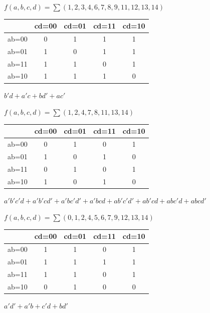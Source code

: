 \documentclass[a4paper,12pt]{article}
\begin{document}
\begin{question}
\begin{subquestion}
\(f(a,b,c,d)=\sum{(1,2,3,4,6,7,8,9,11,12,13,14)}\)\\[0pt]
\begin{answer}
\begin{tabular}{ c|c|c|c|c }
  & cd=00 & cd=01 & cd=11 & cd=10\\
  \hline
  ab=00 & 0 & 1 & 1 & 1\\
  ab=01 & 1 & 0 & 1 & 1\\
  ab=11 & 1 & 1 & 0 & 1\\
  ab=10 & 1 & 1 & 1 & 0
\end{tabular}
\(b'd+a'c+bd'+ac'\)\\[0pt]
\end{answer}
\end{subquestion}

\begin{subquestion}
\(f(a,b,c,d)=\sum{(1,2,4,7,8,11,13,14)}\)\\[0pt]
\begin{answer}
\begin{tabular}{ c|c|c|c|c }
  & cd=00 & cd=01 & cd=11 & cd=10\\
  \hline
  ab=00 & 0 & 1 & 0 & 1\\
  ab=01 & 1 & 0 & 1 & 0\\
  ab=11 & 0 & 1 & 0 & 1\\
  ab=10 & 1 & 0 & 1 & 0
\end{tabular}
\(a'b'c'd + a'b'cd' + a'bc'd' + a'bcd + ab'c'd' + ab'cd + abc'd + abcd'\)\\[0pt]
\end{answer}
\end{subquestion}

\begin{subquestion}
\(f(a,b,c,d)=\sum{(0,1,2,4,5,6,7,9,12,13,14)}\)\\[0pt]
\begin{answer}
\begin{tabular}{ c|c|c|c|c }
  & cd=00 & cd=01 & cd=11 & cd=10\\
  \hline
  ab=00 & 1 & 1 & 0 & 1\\
  ab=01 & 1 & 1 & 1 & 1\\
  ab=11 & 1 & 1 & 0 & 1\\
  ab=10 & 0 & 1 & 0 & 0
\end{tabular}
\(a'd' + a'b + c'd + bd'\)\\[0pt]
\end{answer}
\end{subquestion}


\end{question}
\end{document}
